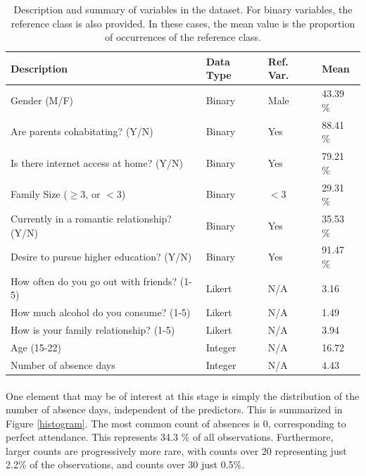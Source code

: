 \documentclass[12pt, titlepage]{article}
\begin{document}
\begin{table}[H]
	\centering
	\begin{tabular}{|l|l|l|l|}
		\hline
		\textbf{Description} & \textbf{Data Type} & \textbf{Ref. Var.} & \textbf{Mean} \\
		\hline
		Gender (M/F) & Binary & Male & 43.39 \% \\
		Are parents cohabitating? (Y/N) & Binary & Yes & 88.41 \% \\
		Is there internet access at home? (Y/N) & Binary & Yes & 79.21 \% \\
		Family Size ($\geq 3$, or $<3$) & Binary & $<3$ & 29.31 \% \\
		Currently in a romantic relationship? (Y/N) & Binary & Yes & 35.53 \% \\
		Desire to pursue higher education? (Y/N) & Binary & Yes & 91.47 \% \\
		How often do you go out with friends? (1-5) & Likert & N/A & 3.16 \\
		How much alcohol do you consume? (1-5) & Likert & N/A & 1.49 \\
		How is your family relationship? (1-5) & Likert & N/A & 3.94 \\
		Age (15-22) & Integer & N/A & 16.72 \\
		\hline
		Number of absence days & Integer & N/A & 4.43 \\ \hline
	\end{tabular}
	\caption{Description and summary of variables in the dataset. For binary variables, the reference class is also provided. In these cases, the mean value is the proportion of occurrences of the reference class.}
	\label{data}
\end{table}


	\paragraph{} One element that may be of interest at this stage is simply the distribution of the number of absence days, independent of the predictors. This is summarized in Figure \ref{histogram}. The most common count of absences is $0$, corresponding to perfect attendance. This represents 34.3 \% of all observations. Furthermore, larger counts are progressively more rare, with counts over $20$ representing just 2.2\% of the observations, and counts over 30 just 0.5\%. 
	
\end{document}
